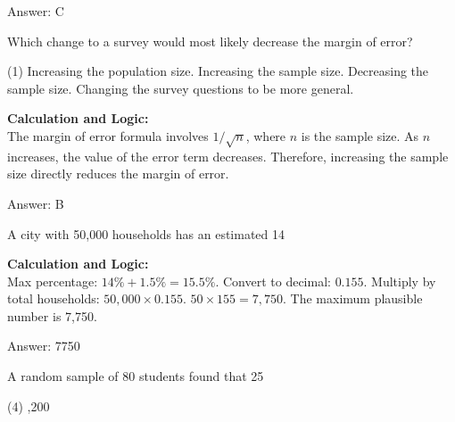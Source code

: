 \documentclass[11pt,paper=a4,answers]{exam}
\begin{document}
\begin{questions}
\begin{solution}
Answer: \colorbox{yellow!100}{C}
\end{solution}

\vspace{60pt}

\question
Which change to a survey would most likely decrease the margin of error?
\begin{tasks}(1)
    \task Increasing the population size.
    \task Increasing the sample size.
    \task Decreasing the sample size.
    \task Changing the survey questions to be more general.
\end{tasks}

\begin{solution}
\textbf{Calculation and Logic:} \\
The margin of error formula involves $1/\sqrt{n}$, where $n$ is the sample size. As $n$ increases, the value of the error term decreases. Therefore, increasing the sample size directly reduces the margin of error.

\vspace{30pt}

Answer: \colorbox{yellow!100}{B}
\end{solution}

\vspace{60pt}

\question
A city with 50,000 households has an estimated 14%

\begin{solution}
\textbf{Calculation and Logic:} \\
Max percentage: $14\% + 1.5\% = 15.5\%$. Convert to decimal: $0.155$. Multiply by total households: $50,000 \times 0.155$. $50 \times 155 = 7,750$. The maximum plausible number is 7,750.

\vspace{30pt}

Answer: \colorbox{yellow!100}{7750}
\end{solution}

\vspace{60pt}

\question
A random sample of 80 students found that 25%
\begin{tasks}(4)
    ,200
\end{tasks}


\end{questions}
\end{document}
